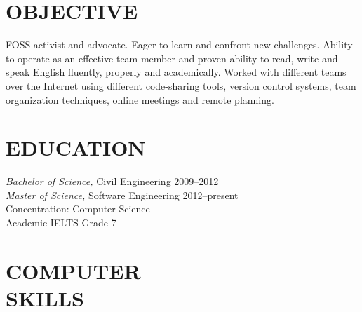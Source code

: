 \documentclass[margin, 10pt]{res} %
\begin{document}
\begin{resume}


\section{OBJECTIVE}
FOSS activist and advocate. Eager to learn and confront new challenges.
Ability to operate as an effective team member and
proven ability to read, write and speak English fluently, properly and academically.
Worked with different teams over the Internet using different code-sharing tools,
version control systems, team organization techniques, online meetings and remote
planning.

\section{EDUCATION}

{\sl Bachelor of Science,} Civil Engineering 2009--2012 \\
{\sl Master of Science,} Software Engineering 2012--present \\
Concentration: Computer Science \\
Academic IELTS Grade 7

\section{COMPUTER \\ SKILLS}


\end{resume}
\end{document}
